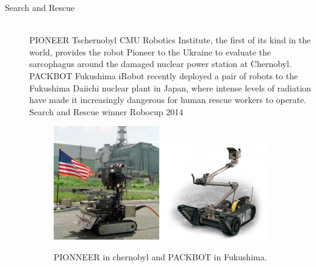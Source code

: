 \begin{description}
\item[Search and Rescue]\hfill \\
PIONEER Tschernobyl
CMU Robotics Institute, the first of its kind in the world, provides the robot Pioneer to the Ukraine to evaluate the sarcophagus around the damaged nuclear power station at Chernobyl. 
PACKBOT Fukushima
iRobot recently deployed a pair of robots to the Fukushima Daiichi nuclear plant in Japan, where intense levels of radiation have made it increasingly dangerous for human rescue workers to operate.
Search and Rescue winner Robocup 2014
\begin{figure}[thpb]
	  \myfloatalign
      \footnotesize
      \centering
    \subfloat
    {  \label{fig:fig_chernobyl}
        \includegraphics[width=0.45\textwidth,height=0.2\textheight]{figures/fig_chernobyl_pioneer.jpg}
    }
    \subfloat
    {  \label{fig:fig_fukushima}
        \includegraphics[width=0.45\textwidth,height=0.2\textheight]{figures/fig_packbot.png}
    }     
   \caption[Rescue robots]{PIONNEER in chernobyl and PACKBOT in Fukushima.}
   \label{fig:fig_rescue}
\end{figure}


\end{description}
